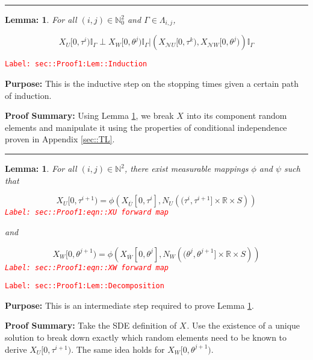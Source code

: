 \documentclass[12pt]{article}
\newcommand{\mb}{\mathbb}
\newcommand{\mc}{\mathcal}
\newcommand{\ov}{\overline}
\newcommand{\tr}{\textcolor{red}}
\newcommand{\labe}[1]{\tr{\texttt{Label: #1}}}
\newcommand{\purpose}{\textbf{Purpose: }}
\newcommand{\pfsum}{\textbf{Proof Summary: }}
\newcommand{\lin}{\rule{\linewidth}{0.4 pt}}
\newcommand{\neigh}{\mc{N}}					%
\renewcommand{\U}{U}							%
\newcommand{\UU}{W}								%
\newcommand{\cl}{\ov}							%
\renewcommand{\S}{S}							%
\newcommand{\poiss}[1]{N_{#1}}						%
\newcommand{\rt}[1]{\tau^{#1}}						%
\newcommand{\rtt}[1]{\theta^{#1}}					%
\renewcommand{\it}{k}								%
\newcommand{\itt}{i}								%
\newcommand{\ittt}{j}								%
\newcommand{\rxvts}[2]{X_{#1}{#2}}					%
\newcommand{\apath}{\Gamma}						%
\newcommand{\pathset}[2]{\Lambda_{#1,#2}}			%
\newtheorem{lem}[thms]{Lemma: }
\begin{document}
\lin

\begin{lem}
For all \((\itt,\ittt)\in \mb{N}_0^2\) and \(\apath \in \pathset{\itt}{\ittt}\),

\[\rxvts{\U}{[0,\rt{\itt})}\mb{I}_{\apath}\perp \rxvts{\UU}{[0,\rtt{\ittt})}\mb{I}_{\apath}|\left(\rxvts{\neigh{\U}}{[0,\rt{\it})},\rxvts{\neigh{\UU}}{[0,\rtt{\ittt})}\right)\mb{I}_{\apath}\]
\label{sec::Proof1:Lem::Induction}
\end{lem}
\labe{sec::Proof1:Lem::Induction}

\purpose This is the inductive step on the stopping times given a certain path of induction.

\pfsum Using Lemma \ref{sec::Proof1:Lem::Decomposition}, we break \(\rxvts{}{}\) into its component random elements and manipulate it using the properties of conditional independence proven in Appendix \ref{sec::TL}.

\lin

\begin{lem}
For all \((\itt,\ittt)\in \mb{N}^2\), there exist measurable mappings \(\phi\) and \(\psi\) such that 

\begin{equation}
\rxvts{\U}{[0,\rt{\itt+1})} = \phi\left(\rxvts{\cl{\U}}{[0,\rt{\itt}]}, \poiss{\U}\left((\rt{\itt}, \rt{\itt+1}]\times \mb{R}\times \S\right)\right)
\label{sec::Proof1:eqn::XU forward map}
\end{equation}
\labe{sec::Proof1:eqn::XU forward map}

and

\begin{equation}
\rxvts{\UU}{[0,\rtt{\ittt+1})} = \phi\left(\rxvts{\cl{\UU}}{[0,\rtt{\ittt}]}, \poiss{\UU}\left((\rtt{\ittt}, \rtt{\ittt+1}]\times \mb{R}\times \S\right)\right)
\label{sec::Proof1:eqn::XW forward map}
\end{equation}
\labe{sec::Proof1:eqn::XW forward map}

\label{sec::Proof1:Lem::Decomposition}
\end{lem}
\labe{sec::Proof1:Lem::Decomposition}

\purpose This is an intermediate step required to prove Lemma \ref{sec::Proof1:Lem::Induction}.

\pfsum Take the SDE definition of \(\rxvts{}{}\). Use the existence of a unique solution to break down exactly which random elements need to be known to derive \(\rxvts{\U}{[0,\rt{\itt+1})}\). The same idea holds for \(\rxvts{\UU}{[0,\rtt{\ittt+1})}\).
\end{document}
